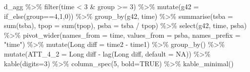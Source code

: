 \documentclass[
]{article}
\newenvironment{Shaded}{\begin{snugshade}}{\end{snugshade}}
\newcommand{\AttributeTok}[1]{\textcolor[rgb]{0.77,0.63,0.00}{#1}}
\newcommand{\ConstantTok}[1]{\textcolor[rgb]{0.00,0.00,0.00}{#1}}
\newcommand{\DecValTok}[1]{\textcolor[rgb]{0.00,0.00,0.81}{#1}}
\newcommand{\FunctionTok}[1]{\textcolor[rgb]{0.00,0.00,0.00}{#1}}
\newcommand{\NormalTok}[1]{#1}
\newcommand{\OtherTok}[1]{\textcolor[rgb]{0.56,0.35,0.01}{#1}}
\newcommand{\SpecialCharTok}[1]{\textcolor[rgb]{0.00,0.00,0.00}{#1}}
\newcommand{\StringTok}[1]{\textcolor[rgb]{0.31,0.60,0.02}{#1}}
\begin{document}
\begin{Shaded}
\begin{Highlighting}[]
\NormalTok{d\_agg }\SpecialCharTok{\%\textgreater{}\%} \FunctionTok{filter}\NormalTok{(time }\SpecialCharTok{\textless{}} \DecValTok{3} \SpecialCharTok{\&}\NormalTok{ group }\SpecialCharTok{\textgreater{}=} \DecValTok{3}\NormalTok{) }\SpecialCharTok{\%\textgreater{}\%}
  \FunctionTok{mutate}\NormalTok{(}\AttributeTok{g42 =} \FunctionTok{if\_else}\NormalTok{(group}\SpecialCharTok{==}\DecValTok{4}\NormalTok{,}\DecValTok{1}\NormalTok{,}\DecValTok{0}\NormalTok{)) }\SpecialCharTok{\%\textgreater{}\%}
  \FunctionTok{group\_by}\NormalTok{(g42, time) }\SpecialCharTok{\%\textgreater{}\%}
  \FunctionTok{summarise}\NormalTok{(}\AttributeTok{tsba =} \FunctionTok{sum}\NormalTok{(tsba),}
            \AttributeTok{tpop =} \FunctionTok{sum}\NormalTok{(tpop),}
            \AttributeTok{psba =}\NormalTok{ tsba }\SpecialCharTok{/}\NormalTok{ tpop) }\SpecialCharTok{\%\textgreater{}\%}
  \FunctionTok{select}\NormalTok{(g42, time, psba) }\SpecialCharTok{\%\textgreater{}\%}
  \FunctionTok{pivot\_wider}\NormalTok{(}\AttributeTok{names\_from =}\NormalTok{ time, }\AttributeTok{values\_from =}\NormalTok{ psba,}
              \AttributeTok{names\_prefix =} \StringTok{"time"}\NormalTok{) }\SpecialCharTok{\%\textgreater{}\%}
  \FunctionTok{mutate}\NormalTok{(}\StringTok{\textasciigrave{}}\AttributeTok{Long diff}\StringTok{\textasciigrave{}} \OtherTok{=} \StringTok{\textasciigrave{}}\AttributeTok{time2}\StringTok{\textasciigrave{}} \SpecialCharTok{{-}} \StringTok{\textasciigrave{}}\AttributeTok{time1}\StringTok{\textasciigrave{}}\NormalTok{) }\SpecialCharTok{\%\textgreater{}\%}
  \FunctionTok{group\_by}\NormalTok{() }\SpecialCharTok{\%\textgreater{}\%}
  \FunctionTok{mutate}\NormalTok{(}\AttributeTok{ATT\_4\_2 =} \StringTok{\textasciigrave{}}\AttributeTok{Long diff}\StringTok{\textasciigrave{}} \SpecialCharTok{{-}} \FunctionTok{lag}\NormalTok{(}\StringTok{\textasciigrave{}}\AttributeTok{Long diff}\StringTok{\textasciigrave{}}\NormalTok{, }\AttributeTok{default =} \ConstantTok{NA}\NormalTok{)) }\SpecialCharTok{\%\textgreater{}\%}
  \FunctionTok{kable}\NormalTok{(}\AttributeTok{digits=}\DecValTok{3}\NormalTok{) }\SpecialCharTok{\%\textgreater{}\%}
  \FunctionTok{column\_spec}\NormalTok{(}\DecValTok{5}\NormalTok{, }\AttributeTok{bold=}\ConstantTok{TRUE}\NormalTok{) }\SpecialCharTok{\%\textgreater{}\%}
  \FunctionTok{kable\_minimal}\NormalTok{()}
\end{Highlighting}
\end{Shaded}
\end{document}
